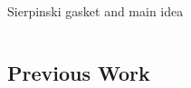 \documentclass[10pt,serif, professionalfont]{beamer}
\begin{document}
\begin{frame}{Sierpinski gasket and main idea}
    \begin{columns}[T] %
        \begin{column}[T]{5cm} %
        \end{column}
        \begin{column}[T]{5cm} %
        \end{column}
    \end{columns}
\end{frame}

\subsection{Previous Work}
\end{document}
